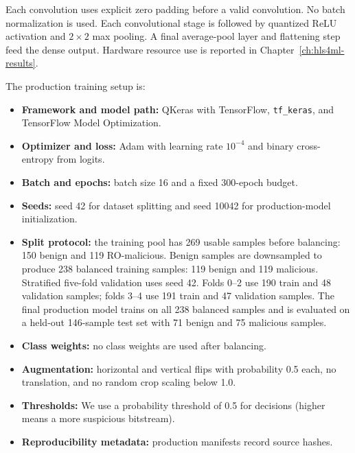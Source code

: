 Each convolution uses explicit zero padding before a valid convolution. No batch normalization is used. Each convolutional stage is followed by quantized ReLU activation and $2 \times 2$ max pooling. A final average-pool layer and flattening step feed the dense output. Hardware resource use is reported in Chapter~\ref{ch:hls4ml-results}.

The production training setup is:
\begin{itemize}
    \item \textbf{Framework and model path:} QKeras with TensorFlow, \texttt{tf\_keras}, and TensorFlow Model Optimization.
    \item \textbf{Optimizer and loss:} Adam with learning rate $10^{-4}$ and binary cross-entropy from logits.
    \item \textbf{Batch and epochs:} batch size 16 and a fixed 300-epoch budget.
    \item \textbf{Seeds:} seed 42 for dataset splitting and seed 10042 for production-model initialization.
    \item \textbf{Split protocol:} the training pool has 269 usable samples before balancing: 150 benign and 119 RO-malicious. Benign samples are downsampled to produce 238 balanced training samples: 119 benign and 119 malicious. Stratified five-fold validation uses seed 42. Folds 0--2 use 190 train and 48 validation samples; folds 3--4 use 191 train and 47 validation samples. The final production model trains on all 238 balanced samples and is evaluated on a held-out 146-sample test set with 71 benign and 75 malicious samples.
    \item \textbf{Class weights:} no class weights are used after balancing.
    \item \textbf{Augmentation:} horizontal and vertical flips with probability 0.5 each, no translation, and no random crop scaling below 1.0.
    \item \textbf{Thresholds:} We use a probability threshold of 0.5 for decisions (higher means a more suspicious bitstream).
    \item \textbf{Reproducibility metadata:} production manifests record source hashes.
\end{itemize}

